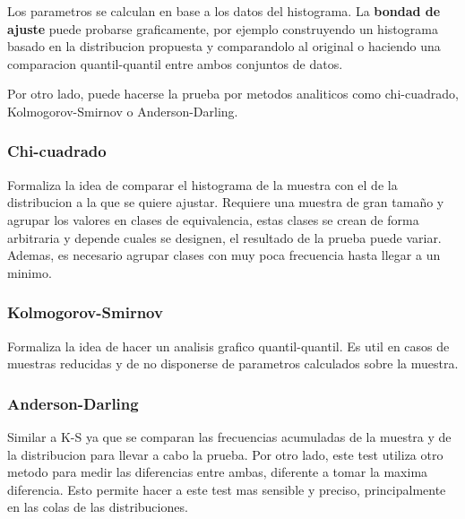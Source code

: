 \documentclass[a4paper]{article}
\begin{document}
Los parametros se calculan en base a los datos del histograma. %
La \textbf{bondad de ajuste} puede probarse graficamente, por ejemplo construyendo un histograma basado en la
distribucion propuesta y comparandolo al original o haciendo una comparacion quantil-quantil entre ambos
conjuntos de datos.

Por otro lado, puede hacerse la prueba por metodos analiticos como chi-cuadrado, Kolmogorov-Smirnov o Anderson-Darling.
\subsubsection*{Chi-cuadrado}
Formaliza la idea de comparar el histograma de la muestra con el de la distribucion a la que se quiere ajustar.
Requiere una muestra de gran tamaño y agrupar los valores en clases de equivalencia, estas clases se crean de forma 
arbitraria y depende cuales se designen, el resultado de la prueba puede variar. Ademas, es necesario agrupar clases
con muy poca frecuencia hasta llegar a un minimo.

\subsubsection*{Kolmogorov-Smirnov}
Formaliza la idea de hacer un analisis grafico quantil-quantil.
Es util en casos de muestras reducidas y de no disponerse de parametros calculados sobre la muestra.

\subsubsection*{Anderson-Darling}
Similar a K-S ya que se comparan las frecuencias acumuladas de la muestra y de la distribucion para llevar a cabo
la prueba. Por otro lado, este test utiliza otro metodo para medir las diferencias entre ambas, diferente a tomar
la maxima diferencia. Esto permite hacer a este test mas sensible y preciso, principalmente en las colas de las 
distribuciones.
\end{document}
